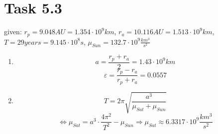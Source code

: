 \documentclass[a4paper,12pt]{article}
\begin{document}
\section*{Task 5.3}
given: $r_p = 9.048 AU = 1.354\cdot 10^9 km$, $r_a = 10.116 AU = 1.513\cdot 10^9 km$, $T=29 years = 9.145\cdot 10^8 s$, $\mu_{Sun} = 132.7\cdot 10^9\frac{km^3}{s^2}$ 
\begin{enumerate}
 \item \[a = \frac{r_p + r_a}{2} = 1.43\cdot 10^{9}km\]
 \[\varepsilon = \frac{r_p-r_a}{r_p+r_a} = 0.0557\]
 \item \[T = 2\pi\sqrt{\frac{a^3}{\mu_{Sat} + \mu_{Sun}}}\]
 \[\Leftrightarrow \mu_{Sat} = a^3\cdot \frac{4\pi^2}{T^2} - \mu_{Sun} \Rightarrow \mu_{Sat} \approx 6.3317\cdot 10^9 \frac{km^3}{s^2}\]
\end{enumerate}
\end{document}
